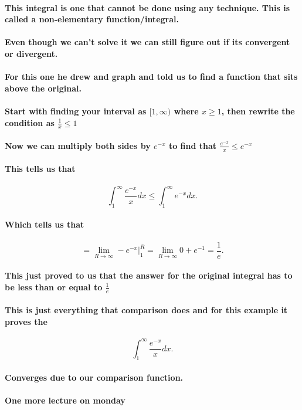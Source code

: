 \documentclass[a4paper]{article}
\begin{document}
\paragraph{This integral is one that cannot be done using any technique. This is called a non-elementary function/integral.}
\paragraph{Even though we can't solve it we can still figure out if its convergent or divergent. }
\paragraph{For this one he drew and graph and told us to find a function that sits above the original. }

\paragraph{Start with finding your interval as $[1,\infty)$ where $x\ge 1$, then rewrite the condition as $\frac{1}{x}\le 1$}
\paragraph{Now we can multiply both sides by $e^{-x}$ to find that $\frac{e^{-x}}{x}\le e^{-x}$}
\paragraph{This tells us that }
\[
\int_{1}^{\infty} \frac{e^{-x}}{x}dx \le \int_{1}^{\infty} e^{-x}dx
.\] 
\paragraph{Which tells us that}
\[
=\lim_{R \to \infty} -e^{-x}|_{1}^{R}=\lim_{R \to \infty} 0+e^{-1}=\frac{1}{e}
.\] 

\paragraph{This just proved to us that the answer for the original integral has to be less than or equal to $\frac{1}{e}$}
\paragraph{This is just everything that comparison does and for this example it proves the }
\[
\int_{1}^{\infty} \frac{e^{-x}}{x}dx
.\] 
\paragraph{Converges due to our comparison function. }

\paragraph{One more lecture on monday}
\end{document}
